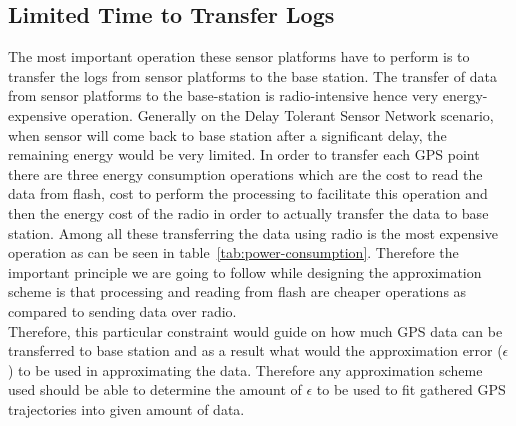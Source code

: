 \documentclass[conference]{IEEEtran}
\begin{document}
\subsection{Limited Time to Transfer Logs} \label{limited-time}
The most important operation these sensor platforms have to perform is to transfer the logs from sensor platforms to the 
base station. The transfer of data from sensor platforms to the base-station is radio-intensive hence very 
energy-expensive operation. Generally on the Delay Tolerant Sensor Network scenario, when sensor will come back 
to base station after a significant delay, the remaining energy would be very limited. In order to transfer each GPS 
point there are three energy consumption operations which are the cost to read the data from flash, cost to perform 
the processing to facilitate this operation and then the energy cost of the radio in order to actually transfer the data 
to base station. Among all these transferring the data using radio is the most expensive operation as can be seen in 
table~\ref{tab:power-consumption}. Therefore the important principle we are going to follow while designing the approximation 
scheme is that processing and reading from flash are cheaper operations as compared to sending data over radio. 
\\
Therefore, this particular constraint would guide on how much GPS data can be transferred to base 
station and as a result what would the approximation error ($\epsilon$) to be used in approximating the data. 
Therefore any approximation scheme used should be able to determine the amount of $\epsilon$ 
to be used to fit gathered GPS trajectories into given amount of data.\
%
%
\end{document}

